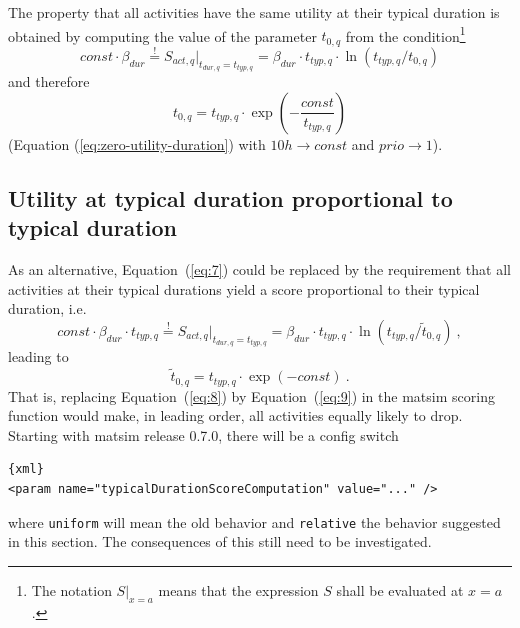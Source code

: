 The property that all activities have the same utility at their typical duration is obtained by computing the value of the parameter $t_{0,q}$ from the condition\footnote{%
%
The notation $S \Big|_{x=a}$ means that the expression $S$ shall be evaluated at $x=a$.
%
}
\begin{equation}
const \cdot \beta_{dur} \stackrel!= S_{act,q} \Big|_{t_{dur,q} = t_{typ,q}}
=
\beta_{dur} \cdot t_{typ,q} \cdot \ln(t_{typ,q}/t_{0,q}) 
\label{eq:7}
\end{equation}
and therefore
\begin{equation}
t_{0,q} = t_{typ,q} \cdot \exp\left( - \frac{const}{t_{typ,q}} \right)
\label{eq:8}
\end{equation}
(\cf Equation (\ref{eq:zero-utility-duration}) with $10h \to const$ and $prio \to 1$). 

\subsection{Utility at typical duration proportional to typical duration}

As an alternative, Equation~(\ref{eq:7}) could be replaced by the requirement that all activities at their typical durations yield a score proportional to their typical duration, i.e.\
\begin{equation}
const \cdot \beta_{dur} \cdot t_{typ,q} \stackrel!= S_{act,q} \Big|_{t_{dur,q} = t_{typ,q}}
=
\beta_{dur} \cdot t_{typ,q} \cdot \ln(t_{typ,q}/\tilde t_{0,q}) \ , 
\end{equation}
leading to
\begin{equation}
\tilde t_{0,q} = t_{typ,q} \cdot \exp( - const ) \ .
\label{eq:9}
\end{equation}
That is, replacing Equation~(\ref{eq:8}) by Equation~(\ref{eq:9}) in the \gls{matsim} scoring function would make, in leading order, all activities equally likely to drop.  Starting with \gls{matsim} release 0.7.0, there will be a config switch 
\begin{lstlisting}{xml}
<param name="typicalDurationScoreComputation" value="..." />
\end{lstlisting}
where \lstinline{uniform} will mean the old behavior and \lstinline{relative} the behavior suggested in this section.  The consequences of this still need to be investigated.



